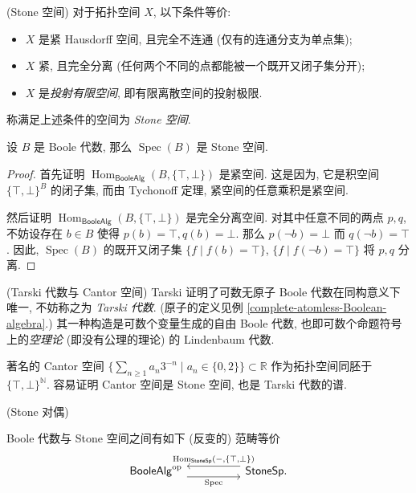 \begin{propdef}
	{(Stone 空间)}
	对于拓扑空间 $X$, 以下条件等价:
	\begin{itemize}
		\item $X$ 是紧 Hausdorff 空间, 且完全不连通 (仅有的连通分支为单点集);
		\item $X$ 紧, 且完全分离 (任何两个不同的点都能被一个既开又闭子集分开);
		\item $X$ 是\emph{投射有限空间}, 即有限离散空间的投射极限.
	\end{itemize}
	称满足上述条件的空间为 \emph{Stone 空间}.
\end{propdef}

\begin{prop}
	{}
	设 $B$ 是 Boole 代数, 那么 $\operatorname{Spec}(B)$ 是 Stone 空间.
\end{prop}

\begin{proof}
	首先证明 $\operatorname{Hom}_{\mathsf {BooleAlg}}(B,\{\top,\bot\})$ 是紧空间. 这是因为, 它是积空间 $\{\top,\bot\}^{B}$ 的闭子集, 而由 Tychonoff 定理, 紧空间的任意乘积是紧空间.%
	
	然后证明 $\operatorname{Hom}_{\mathsf {BooleAlg}}(B,\{\top,\bot\})$ 是完全分离空间. 对其中任意不同的两点 $p,q$,
	不妨设存在 $b\in B$ 使得 $p(b)=\top,q(b)=\bot$.
	那么 $p(\neg b)=\bot$ 而 $q(\neg b)=\top$.
	因此, $\operatorname{Spec}(B)$ 的既开又闭子集
	$\{f\mid f(b)=\top\}$, $\{f\mid f(\neg b)=\top\}$ 将 $p,q$ 分离.
\end{proof}

\begin{example}
	{(Tarski 代数与 Cantor 空间)}
	Tarski 证明了可数无原子 Boole 代数在同构意义下唯一, 不妨称之为 \emph{Tarski 代数}. (原子的定义见例 \ref{complete-atomless-Boolean-algebra}.) 其一种构造是可数个变量生成的自由 Boole 代数, 也即可数个命题符号上的\emph{空理论} (即没有公理的理论) 的 Lindenbaum 代数.
	
	著名的 Cantor 空间 $\big\{\sum_{n\geq 1}a_n3^{-n}\mid a_n\in\{0,2\}\big\}\subset \mathbb{R}$ 作为拓扑空间同胚于 $\{\top,\bot\}^{\mathbb{N}}$. 容易证明 Cantor 空间是 Stone 空间, 也是 Tarski 代数的谱.
\end{example}

\begin{prop}
	[label={Stone-duality}]
	{(Stone 对偶)}
	
	Boole 代数与 Stone 空间之间有如下 (反变的) 范畴等价
	\[\begin{tikzcd}[ampersand replacement=\&]
		{\mathsf {BooleAlg}^{\op}} \&\& {\mathsf {StoneSp}.}
		\arrow["{\operatorname{Spec}}"', shift right=2, from=1-1, to=1-3]
		\arrow["{\operatorname{Hom}_{\mathsf {StoneSp}}(-,\{\top,\bot\})}"', shift right=2, from=1-3, to=1-1]
	\end{tikzcd}\]
\end{prop}

